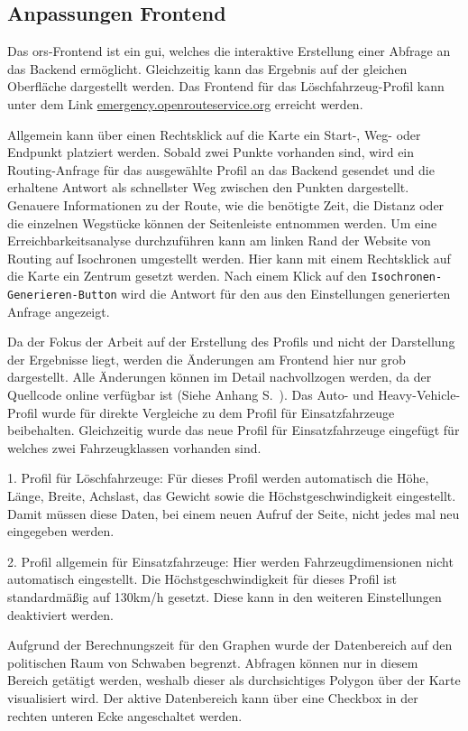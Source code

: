 \subsection{Anpassungen Frontend}

Das \gls{ors}-Frontend ist ein \gls{gui}, welches die interaktive Erstellung einer Abfrage an das Backend ermöglicht.
Gleichzeitig kann das Ergebnis auf der gleichen Oberfläche dargestellt werden.
Das Frontend für das Löschfahrzeug-Profil kann unter dem Link \href{emergency.openrouteservice.org}{emergency.openrouteservice.org} erreicht werden.

\bigskip

Allgemein kann über einen Rechtsklick auf die Karte ein Start-, Weg- oder Endpunkt platziert werden.
Sobald zwei Punkte vorhanden sind, wird ein Routing-Anfrage für das ausgewählte Profil an das Backend gesendet und die erhaltene Antwort als schnellster Weg zwischen den Punkten dargestellt.
Genauere Informationen zu der Route, wie die benötigte Zeit, die Distanz oder die einzelnen Wegstücke können der Seitenleiste entnommen werden.
Um eine Erreichbarkeitsanalyse durchzuführen kann am linken Rand der Website von Routing auf Isochronen umgestellt werden.
Hier kann mit einem Rechtsklick auf die Karte ein Zentrum gesetzt werden.
Nach einem Klick auf den \texttt{Isochronen-Generieren-Button} wird die Antwort für den aus den Einstellungen generierten Anfrage angezeigt.

\bigskip

Da der Fokus der Arbeit auf der Erstellung des Profils und nicht der Darstellung der Ergebnisse liegt, werden die Änderungen am Frontend hier nur grob dargestellt.
Alle Änderungen können im Detail nachvollzogen werden, da der Quellcode online verfügbar ist (Siehe Anhang S.~\pageref{sec:anhang}). Das Auto- und Heavy-Vehicle-Profil wurde für direkte Vergleiche zu dem Profil für Einsatzfahrzeuge beibehalten.
Gleichzeitig wurde das neue Profil für Einsatzfahrzeuge eingefügt für welches zwei Fahrzeugklassen vorhanden sind.

\bigskip

1. Profil für Löschfahrzeuge: Für dieses Profil werden automatisch die Höhe, Länge, Breite, Achslast, das Gewicht sowie die Höchstgeschwindigkeit eingestellt.
Damit müssen diese Daten, bei einem neuen Aufruf der Seite, nicht jedes mal neu eingegeben werden.

\medskip

2. Profil allgemein für Einsatzfahrzeuge: Hier werden Fahrzeugdimensionen nicht automatisch eingestellt.
Die Höchstgeschwindigkeit für dieses Profil ist standardmäßig auf 130km/h gesetzt.
Diese kann in den weiteren Einstellungen deaktiviert werden.

\bigskip

Aufgrund der Berechnungszeit für den Graphen wurde der Datenbereich auf den politischen Raum von Schwaben begrenzt.
Abfragen können nur in diesem Bereich getätigt werden, weshalb dieser als durchsichtiges Polygon über der Karte visualisiert wird.
Der aktive Datenbereich kann über eine Checkbox in der rechten unteren Ecke angeschaltet werden.
